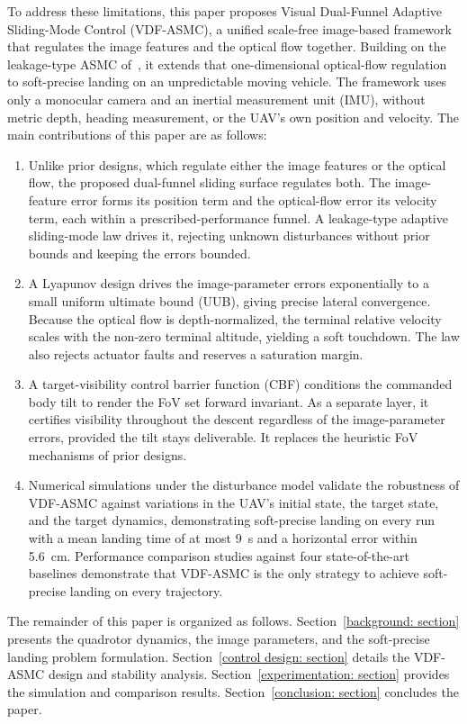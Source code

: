 \documentclass{IEEEtaes}
\begin{document}
To address these limitations, this paper proposes Visual Dual-Funnel Adaptive Sliding-Mode Control (VDF-ASMC), a unified scale-free image-based framework that regulates the image features and the optical flow together. Building on the leakage-type ASMC of~\cite{singhal2025}, it extends that one-dimensional optical-flow regulation to soft-precise landing on an unpredictable moving vehicle. The framework uses only a monocular camera and an inertial measurement unit (IMU), without metric depth, heading measurement, or the UAV's own position and velocity. The main contributions of this paper are as follows:
\begin{enumerate}
\item Unlike prior designs, which regulate either the image features or the optical flow, the proposed dual-funnel sliding surface regulates both. The image-feature error forms its position term and the optical-flow error its velocity term, each within a prescribed-performance funnel. A leakage-type adaptive sliding-mode law drives it, rejecting unknown disturbances without prior bounds and keeping the errors bounded.
\item A Lyapunov design drives the image-parameter errors exponentially to a small uniform ultimate bound (UUB), giving precise lateral convergence. Because the optical flow is depth-normalized, the terminal relative velocity scales with the non-zero terminal altitude, yielding a soft touchdown. The law also rejects actuator faults and reserves a saturation margin.
\item A target-visibility control barrier function (CBF) conditions the commanded body tilt to render the FoV set forward invariant. As a separate layer, it certifies visibility throughout the descent regardless of the image-parameter errors, provided the tilt stays deliverable. It replaces the heuristic FoV mechanisms of prior designs.
\item Numerical simulations under the disturbance model validate the robustness of VDF-ASMC against variations in the UAV's initial state, the target state, and the target dynamics, demonstrating soft-precise landing on every run with a mean landing time of at most 9~s and a horizontal error within 5.6~cm. Performance comparison studies against four state-of-the-art baselines demonstrate that VDF-ASMC is the only strategy to achieve soft-precise landing on every trajectory.
\end{enumerate}
The remainder of this paper is organized as follows. Section~\ref{background: section} presents the quadrotor dynamics, the image parameters, and the soft-precise landing problem formulation. Section~\ref{control design: section} details the VDF-ASMC design and stability analysis. Section~\ref{experimentation: section} provides the simulation and comparison results. Section~\ref{conclusion: section} concludes the paper.
\end{document}
